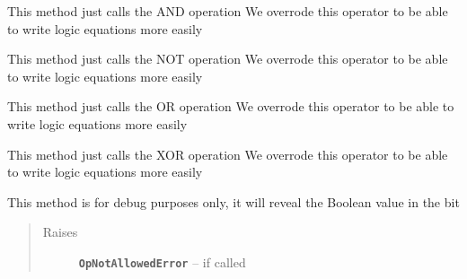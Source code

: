 \documentclass[letterpaper,10pt,english]{sphinxmanual}
\begin{document}
\begin{fulllineitems}
\begin{fulllineitems}
\end{fulllineitems}


\begin{fulllineitems}
\label{datatypes.bits:datatypes.bits.Bit.Bit.__mul__}
This method just calls the AND operation
We overrode this operator to be able to write logic equations more easily

\end{fulllineitems}


\begin{fulllineitems}
\label{datatypes.bits:datatypes.bits.Bit.Bit.__neg__}
This method just calls the NOT operation
We overrode this operator to be able to write logic equations more easily

\end{fulllineitems}


\begin{fulllineitems}
\label{datatypes.bits:datatypes.bits.Bit.Bit.__or__}
This method just calls the OR operation
We overrode this operator to be able to write logic equations more easily

\end{fulllineitems}


\begin{fulllineitems}
\label{datatypes.bits:datatypes.bits.Bit.Bit.__xor__}
This method just calls the XOR operation
We overrode this operator to be able to write logic equations more easily

\end{fulllineitems}


\begin{fulllineitems}
\label{datatypes.bits:datatypes.bits.Bit.Bit.debug__printAsBoolean}
This method is for debug purposes only, it will reveal the Boolean value in the bit
\begin{quote}\begin{description}
\item[{Raises}] \leavevmode
\textbf{\texttt{OpNotAllowedError}} -- if called

\end{description}\end{quote}

\end{fulllineitems}


\end{fulllineitems}
\end{document}

